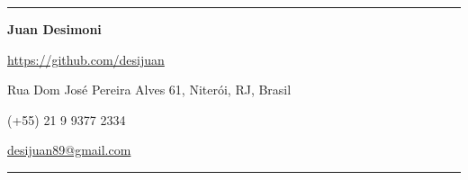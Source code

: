 \documentclass[12pt, a4paper]{article}
\makeatletter
\newcommand{\email}{desijuan89@gmail.com}
\newcommand{\github}{https://github.com/desijuan}
\makeatother
\begin{document}
\pagestyle{empty}
\thispagestyle{empty}

\rule{\textwidth}{1.5pt}\par
\begin{minipage}[c]{.37\textwidth}
  \vspace{7pt}
  {\Huge\color{teal}\bfseries Juan Desimoni}\par
  \vspace{4pt}
  \url{\github}
  \vspace{6pt}
\end{minipage}
\hfill
\begin{minipage}[c]{.5\textwidth}
  \raggedleft
  Rua Dom José Pereira Alves 61, Niterói, RJ, Brasil\par
  (+55) 21 9 9377 2334\par
  \href{mailto:\email}{\email}
\end{minipage}
\rule{\textwidth}{1.5pt}\par
\vspace{1pt}
\end{document}
